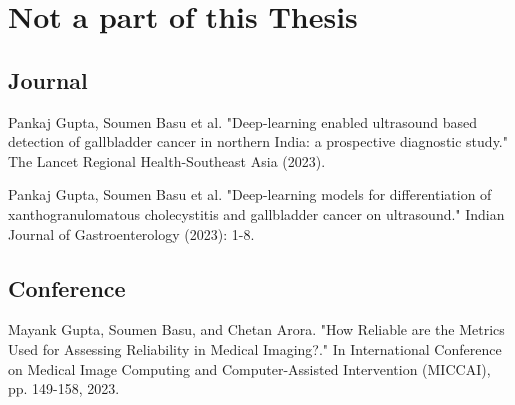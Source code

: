 \section*{Not a part of this Thesis}
\subsection*{Journal}
\begin{enumerate}[label={[J.\arabic*]}]
\setcounter{enumi}{1}
    \item Pankaj Gupta, Soumen Basu et al. "Deep-learning enabled ultrasound based detection of gallbladder cancer in northern India: a prospective diagnostic study." The Lancet Regional Health-Southeast Asia (2023).
    \item Pankaj Gupta, Soumen Basu et al. "Deep-learning models for differentiation of xanthogranulomatous cholecystitis and gallbladder cancer on ultrasound." Indian Journal of Gastroenterology (2023): 1-8.
\end{enumerate}
\subsection*{Conference}
\begin{enumerate}[label={[C.\arabic*]}]
\setcounter{enumi}{3}
    \item Mayank Gupta, Soumen Basu, and Chetan Arora. "How Reliable are the Metrics Used for Assessing Reliability in Medical Imaging?." In International Conference on Medical Image Computing and Computer-Assisted Intervention (MICCAI), pp. 149-158, 2023.
\end{enumerate}
